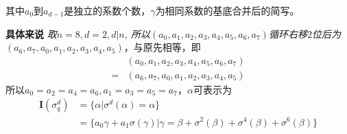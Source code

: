 \begin{solution}
\begin{equation*}
    \end{equation*}
    其中$a_0$到$a_{d-1}$是独立的系数个数，$\gamma$为相同系数的基底合并后的简写。
    \begin{tcolorbox}
        \textbf{具体来说} 
        \textit{取$n=8, d=2, d|n$, 所以$(a_0,a_1,a_2,a_3,a_4,a_5,a_6,a_7)$循环右移$2$位后为}$(a_6,a_7,a_0,a_1,a_2,a_3,a_4,a_5)$，与原先相等，即
        \begin{equation*}
            \begin{aligned}
                &(a_0,a_1,a_2,a_3,a_4,a_5,a_6,a_7)\\
                =&(a_6,a_7,a_0,a_1,a_2,a_3,a_4,a_5)
            \end{aligned}
        \end{equation*}
        所以$a_0=a_2=a_4=a_6,a_1=a_3=a_5=a_7$，$\alpha$可表示为
        \begin{equation*}
            \begin{aligned}
                \textbf{I}(\sigma_q^d)&=\{\alpha|\sigma^d(\alpha)=\alpha\}\\
                &=\{a_0\gamma+a_1\sigma(\gamma)|\gamma=\beta+\sigma^{2}(\beta)+\sigma^{4}(\beta)+\sigma^{6}(\beta)\}
            \end{aligned}
        \end{equation*}
    \end{tcolorbox}
\end{solution}